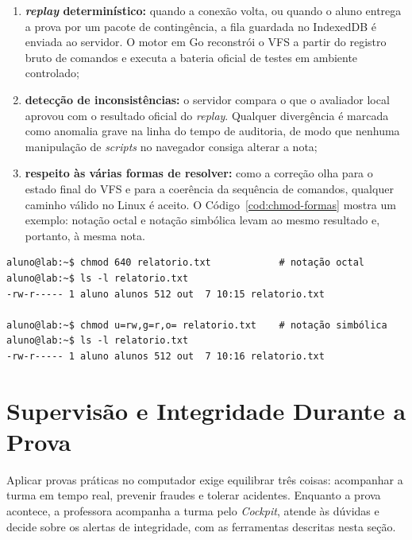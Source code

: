 \begin{enumerate}
    \item \textbf{\textit{replay} determinístico:} quando a conexão volta, ou quando o aluno entrega a prova por um pacote de contingência, a fila guardada no IndexedDB é enviada ao servidor. O motor em Go reconstrói o VFS a partir do registro bruto de comandos e executa a bateria oficial de testes em ambiente controlado;
    \item \textbf{detecção de inconsistências:} o servidor compara o que o avaliador local aprovou com o resultado oficial do \textit{replay}. Qualquer divergência é marcada como anomalia grave na linha do tempo de auditoria, de modo que nenhuma manipulação de \textit{scripts} no navegador consiga alterar a nota;
    \item \textbf{respeito às várias formas de resolver:} como a correção olha para o estado final do VFS e para a coerência da sequência de comandos, qualquer caminho válido no Linux é aceito. O Código~\ref{cod:chmod-formas} mostra um exemplo: notação octal e notação simbólica levam ao mesmo resultado e, portanto, à mesma nota.
\end{enumerate}

\noindent\begin{minipage}{\linewidth}
\begin{lstlisting}[style=terminal, caption={Duas formas equivalentes de resolver a mesma tarefa de permissão}, label={cod:chmod-formas}]
aluno@lab:~$ chmod 640 relatorio.txt            # notação octal
aluno@lab:~$ ls -l relatorio.txt
-rw-r----- 1 aluno alunos 512 out  7 10:15 relatorio.txt

aluno@lab:~$ chmod u=rw,g=r,o= relatorio.txt    # notação simbólica
aluno@lab:~$ ls -l relatorio.txt
-rw-r----- 1 aluno alunos 512 out  7 10:16 relatorio.txt
\end{lstlisting}
\vspace{-0.6em}
\end{minipage}
\vspace{0.6em}

\section{Supervisão e Integridade Durante a Prova}
\label{sec:governanca-seguranca}

Aplicar provas práticas no computador exige equilibrar três coisas: acompanhar a turma em tempo real, prevenir fraudes e tolerar acidentes. Enquanto a prova acontece, a professora acompanha a turma pelo \textit{Cockpit}, atende às dúvidas e decide sobre os alertas de integridade, com as ferramentas descritas nesta seção.

